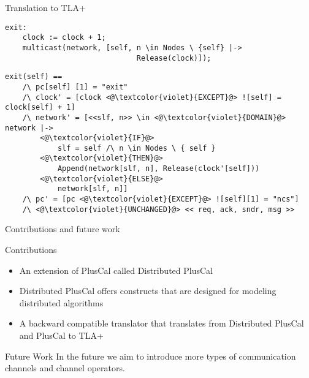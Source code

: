 \documentclass{beamer}
\begin{document}
\begin{frame}[fragile]{Translation to TLA+}
 \begin{lstlisting}[language=pluscal, frame = tlrb, numbers=none]  
 exit:  
    clock := clock + 1;
    multicast(network, [self, n \in Nodes \ {self} |->
                              Release(clock)]);
\end{lstlisting}


\begin{lstlisting}[language=pluscal, frame = tlrb, numbers=none]  
exit(self) == 
    /\ pc[self] [1] = "exit"
    /\ clock' = [clock <@\textcolor{violet}{EXCEPT}@> ![self] = clock[self] + 1]
    /\ network' = [<<slf, n>> \in <@\textcolor{violet}{DOMAIN}@> network |->
        <@\textcolor{violet}{IF}@> 
            slf = self /\ n \in Nodes \ { self } 
        <@\textcolor{violet}{THEN}@> 
            Append(network[slf, n], Release(clock'[self])) 
        <@\textcolor{violet}{ELSE}@>
            network[slf, n]]
    /\ pc' = [pc <@\textcolor{violet}{EXCEPT}@> ![self][1] = "ncs"]
    /\ <@\textcolor{violet}{UNCHANGED}@> << req, ack, sndr, msg >>
\end{lstlisting}
\end{frame}



\begin{frame}{Contributions and future work}
\begin{block}{Contributions}
\begin{itemize}
    \item An extension of PlusCal called Distributed PlusCal
    \item Distributed PlusCal offers constructs that are designed for modeling distributed algorithms

    \item A backward compatible translator that translates from Distributed PlusCal and PlusCal  to TLA+


\end{itemize}
\end{block}
\begin{block}{Future Work}
In the future we aim to introduce more types of communication channels and channel operators.
\end{block}

\end{frame}
\end{document}
